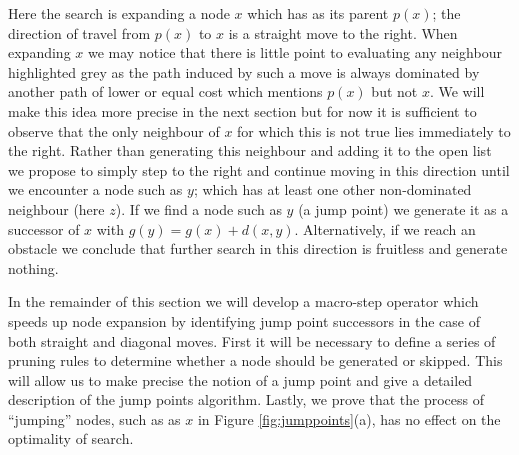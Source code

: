 Here the search is expanding a node $x$ which has as its parent $p(x)$;
the direction of travel from $p(x)$ to $x$ is a straight move to the right.
When expanding $x$ we may notice that there is little point to evaluating any
neighbour highlighted grey as the path induced by such a move is always dominated 
by another path of lower or equal cost which mentions $p(x)$ but not $x$.
We will make this idea more precise in the next section but for now it is 
sufficient to observe that the only neighbour of $x$ for which this is not 
true lies immediately to the right.
Rather than generating this neighbour and adding it to the open list we propose 
to simply step to the right and continue moving in this direction until we
encounter a node such as $y$; which has at least one other non-dominated
neighbour (here $z$). 
If we find a node such as $y$ (a jump point) we generate it as a successor 
of $x$ with $g(y) = g(x) + d(x, y)$.
Alternatively, if we reach an obstacle we conclude that further search in this
direction is fruitless and generate nothing.
\par
In the remainder of this section we will develop a macro-step operator which 
speeds up node expansion by identifying jump point successors in the case of
both straight and diagonal moves. First it will be necessary to define a series of
pruning rules to determine whether a node should be generated 
or skipped. 
This will allow us to make precise the notion of a jump point and 
give a detailed description of the jump points algorithm.
Lastly, we prove that the process of ``jumping'' nodes, such as as $x$ in 
Figure \ref{fig:jumppoints}(a), has no effect on the optimality of search.





